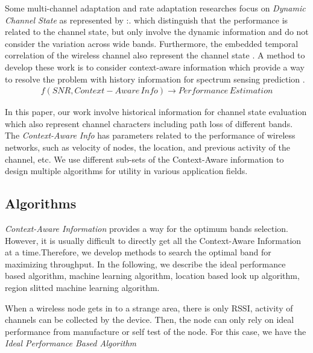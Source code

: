 
Some multi-channel adaptation and rate adaptation researches focus on \emph{Dynamic Channel State} as represented by \cite{cordeiro2007c,MOAR}:. 
which distinguish that the performance is related to the channel state, but only involve the dynamic information and do not consider the variation across wide bands. 
Furthermore, the embedded temporal correlation of the wireless channel also represent the channel state \cite{liuastra}. 
A method to develop these work is to consider context-aware information which provide a way to resolve the problem with history information for spectrum sensing prediction \cite{yucek2009survey}.
\begin{align}
\label{euqation:performance estimation}
f(SNR,Context-Aware\, Info) \rightarrow Performance\, Estimation
\end{align}

In this paper, our work involve historical information for channel state evaluation which also represent channel characters including path loss of different bands.
The \emph{Context-Aware Info} has parameters related to the performance of wireless networks, such as velocity of nodes, the location, and previous activity of the channel, etc. 
We use different sub-sets of the Context-Aware information to design multiple algorithms for utility in various application fields. 



\subsection{Algorithms}
\label{subsec:algorithms}

\emph{Context-Aware Information} provides a way for the optimum bands selection. However, it is usually difficult to directly get all the Context-Aware Information at a time.Therefore, we develop methods to search the optimal band for maximizing throughput. In the following, we describe the ideal performance based algorithm, machine learning algorithm, location based look up algorithm, region slitted machine learning algorithm.

When a wireless node gets in to a strange area, there is only RSSI, activity of channels can be collected by the device. Then, the node can only rely on ideal performance from manufacture or self test of the node. For this case, we have the \emph{Ideal Performance Based Algorithm}

